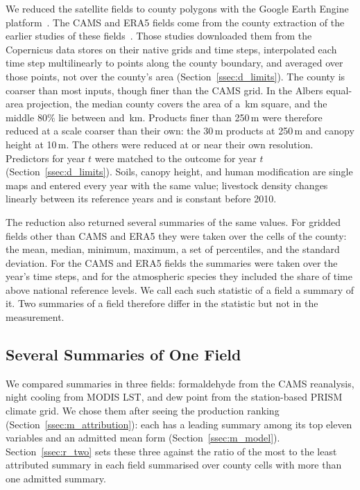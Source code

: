 \documentclass[sensors,article,submit,moreauthors,pdftex]{Definitions/mdpi}
\begin{document}



We reduced the satellite fields to county polygons with the Google Earth Engine
platform~\cite{Gorelick2017}. The CAMS and ERA5
fields come from the county extraction of the earlier studies of these
fields~\cite{Ruwali2026multi, Shrestha2026exp}. Those studies downloaded them
from the Copernicus data stores on their native grids and time steps,
interpolated each time step multilinearly to points along the county boundary,
and averaged over those points, not over the county's area (Section~\ref{ssec:d_limits}).
The county is
coarser than most inputs, though finer than the CAMS grid. In
the Albers equal-area projection, the median county covers the area of a
\CountyScaleMed{}\,km square, and the middle 80\% lie between
\CountyScaleLo{} and \CountyScaleHi{}\,km. Products finer than 250\,m were
therefore reduced at a scale coarser than their own: the 30\,m products at
250\,m and canopy height at 10\,m. The others were reduced at or near their own
resolution.
Predictors for year $t$ were matched to the outcome for year $t$
(Section~\ref{ssec:d_limits}). Soils, canopy
height, and human modification are single maps and entered every year with the
same value; livestock density changes linearly between its reference years and
is constant before 2010.

The reduction also returned several summaries of the same values. For
gridded fields other than CAMS and ERA5 they were taken over the cells of the
county: the mean, median, minimum, maximum, a set of percentiles, and the
standard deviation. For the CAMS and ERA5 fields the summaries were taken over the
year's time steps, and for the atmospheric species they included the share of
time above national reference levels. We call each such statistic of a field
a summary of it. Two summaries of a field therefore differ
in the statistic but not in the measurement.
\subsection{Several Summaries of One Field}
\label{ssec:m_descriptions}
We compared summaries in three fields: formaldehyde from the CAMS reanalysis,
night cooling from MODIS LST, and dew point from the station-based PRISM
climate grid. We chose them after seeing the production ranking
(Section~\ref{ssec:m_attribution}): each has a leading summary among its top
eleven variables and an
admitted mean form (Section~\ref{ssec:m_model}). Section~\ref{ssec:r_two} sets
these three against the ratio of the most to the least attributed summary in
each field summarised over county cells with more than one admitted summary.
\end{document}
